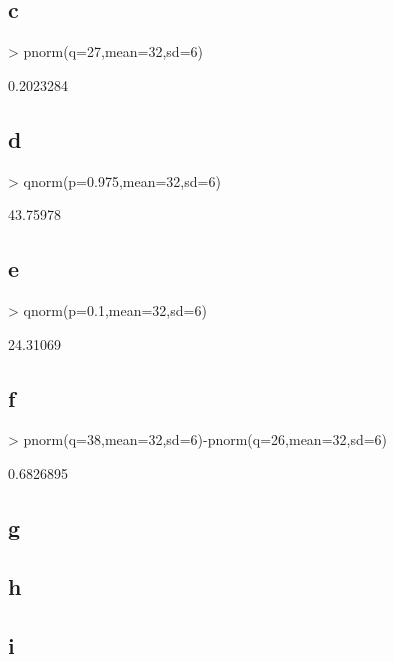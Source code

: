 \subsection{c}
\begin{Schunk}
\begin{Sinput}
> pnorm(q=27,mean=32,sd=6)
\end{Sinput}
\begin{Soutput}
[1] 0.2023284
\end{Soutput}
\end{Schunk}

\subsection{d}
\begin{Schunk}
\begin{Sinput}
> qnorm(p=0.975,mean=32,sd=6)
\end{Sinput}
\begin{Soutput}
[1] 43.75978
\end{Soutput}
\end{Schunk}

\subsection{e}
\begin{Schunk}
\begin{Sinput}
> qnorm(p=0.1,mean=32,sd=6)
\end{Sinput}
\begin{Soutput}
[1] 24.31069
\end{Soutput}
\end{Schunk}

\subsection{f}
\begin{Schunk}
\begin{Sinput}
> pnorm(q=38,mean=32,sd=6)-pnorm(q=26,mean=32,sd=6)
\end{Sinput}
\begin{Soutput}
[1] 0.6826895
\end{Soutput}
\end{Schunk}

\subsection{g}


\subsection{h}


\subsection{i}



